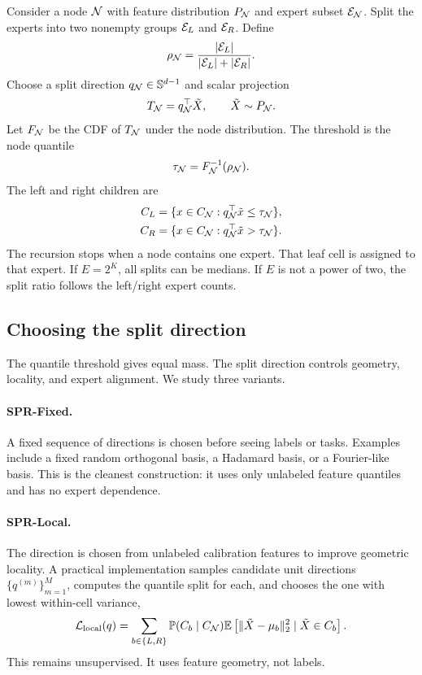 \documentclass{article}
\begin{document}
Consider a node $\mathcal{N}$ with feature distribution $P_{\mathcal{N}}$ and expert subset
$\mathcal{E}_{\mathcal{N}}$.  Split the experts into two nonempty groups
$\mathcal{E}_L$ and $\mathcal{E}_R$.  Define
\begin{equation}
 \rho_{\mathcal{N}}=\frac{|\mathcal{E}_L|}{|\mathcal{E}_L|+|\mathcal{E}_R|}.
\end{equation}
Choose a split direction $q_{\mathcal{N}}\in\mathbb{S}^{d-1}$ and scalar projection
\begin{equation}
 T_{\mathcal{N}}=q_{\mathcal{N}}^{\top}\tilde X,\qquad \tilde X\sim P_{\mathcal{N}}.
\end{equation}
Let $F_{\mathcal{N}}$ be the CDF of $T_{\mathcal{N}}$ under the node distribution.  The
threshold is the node quantile
\begin{equation}
 \tau_{\mathcal{N}}=F_{\mathcal{N}}^{-1}(\rho_{\mathcal{N}}).
\end{equation}
The left and right children are
\begin{align}
 C_L &= \{x\in C_{\mathcal{N}}: q_{\mathcal{N}}^{\top}\tilde x\le \tau_{\mathcal{N}}\},\\
 C_R &= \{x\in C_{\mathcal{N}}: q_{\mathcal{N}}^{\top}\tilde x> \tau_{\mathcal{N}}\}.
\end{align}
The recursion stops when a node contains one expert.  That leaf cell is assigned
to that expert.  If $E=2^K$, all splits can be medians.  If $E$ is not a power
of two, the split ratio follows the left/right expert counts.

\subsection{Choosing the split direction}

The quantile threshold gives equal mass.  The split direction controls geometry,
locality, and expert alignment.  We study three variants.

\paragraph{SPR-Fixed.}
A fixed sequence of directions is chosen before seeing labels or tasks.  Examples
include a fixed random orthogonal basis, a Hadamard basis, or a Fourier-like
basis.  This is the cleanest construction: it uses only unlabeled feature
quantiles and has no expert dependence.

\paragraph{SPR-Local.}
The direction is chosen from unlabeled calibration features to improve geometric
locality.  A practical implementation samples candidate unit directions
$\{q^{(m)}\}_{m=1}^M$, computes the quantile split for each, and chooses the one
with lowest within-cell variance,
\begin{equation}
  \mathcal{L}_{\mathrm{local}}(q)
  =\sum_{b\in\{L,R\}} \mathbb{P}(C_b\mid C_{\mathcal{N}})
  \mathbb{E}\left[\|\tilde X-\mu_b\|_2^2\mid \tilde X\in C_b\right].
\end{equation}
This remains unsupervised.  It uses feature geometry, not labels.
\end{document}
